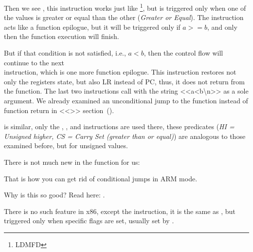 
Then we see , this instruction works just like \footnote{\ac{LDMFD}},
but is triggered only when one of the values is greater or equal than the other (\emph{Greater or Equal}).
The  instruction acts like a function epilogue, but it will be triggered only if $a>=b$, and only then the function execution will finish.


But if that condition is not satisfied, i.e., $a<b$, then the control flow will continue to the next \\
 instruction, which is one more function epilogue. This instruction restores not only the  registers state, but also \ac{LR} instead of \ac{PC}, thus, it does not return from the function.
The last two instructions call \printf with the string <<a<b\textbackslash{}n>> as a sole argument.
We already examined an unconditional jump to the \printf function instead of function return in <<\PrintfSeveralArgumentsSectionName>> section~().

 is similar, only the , , and  instructions are used there, these predicates (\emph{HI = Unsigned higher, CS = Carry Set (greater than or equal)}) are analogous to those examined before, but for unsigned values.

There is not much new in the \main function for us:



That is how you can get rid of conditional jumps in ARM mode.

Why is this so good? Read here: .


There is no such feature in x86, except the  instruction, it is the same as \MOV,
but triggered only when specific flags are set, usually set by \CMP.

\mysubparagraph{\OptimizingKeilVI (\ThumbMode)}



